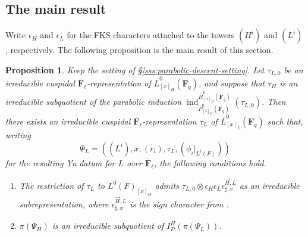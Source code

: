 \documentclass[reqno]{amsart}
\numberwithin{equation}{subsection}
\newcommand{\F}{\mathbf{F}}
\newcommand{\ol}[1]{\overline{#1}}
\DeclareMathOperator{\ind}{ind}
\newtheorem{prop}[thm]{Proposition}
\theoremstyle{remark}
\numberwithin{equation}{subsection}
\numberwithin{figure}{subsection}
\begin{document}
\subsection{The main result}

Write $\epsilon_H$ and $\epsilon_L$ for the FKS characters \cite[(3.3.1)]{CF26a} attached to the towers $(H^i)$ and $(L^i)$, respectively. The following proposition is the main result of this section. 

\begin{prop}\label{prop:tame-cuspidal-parabolic-induction}
Keep the setting of \S\ref{sss:parabolic-descent-setting}. Let $\tau_{L,0}$ be an irreducible cuspidal $\ol\F_\ell$-representation of $\ol L^0_{[x]_H}(\F_q)$, and suppose that $\tau_H$ is an irreducible subquotient of the parabolic induction $\ind_{\ol P^0_{[x]_H}(\F_q)}^{\ol H^0_{[x]_H}(\F_q)}(\tau_{L,0})$. Then there exists an irreducible cuspidal $\ol\F_\ell$-representation $\tau_L$ of $\ol L^0_{[x]_L}(\F_q)$ such that, writing 
\[
\Psi_L = ((L^i), x, (r_i), \tau_L, (\phi_i|_{L^i(F)}))
\]
for the resulting Yu datum for $L$ over $\ol\F_\ell$, the following conditions hold.
\begin{enumerate}
    \item The restriction of $\tau_L$ to $L^0(F)_{[x]_H}$ admits
    $\tau_{L,0}\otimes \epsilon_H\epsilon_L\epsilon_{\sharp,x}^{\vec H,L}$
    as an irreducible subrepresentation, where $\epsilon_{\sharp,x}^{\vec H, L}$ is the sign character from \cite[(3.3.4)]{CF26a}.
    \item $\pi(\Psi_H)$ is an irreducible subquotient of $I_P^H(\pi(\Psi_L))$.
\end{enumerate}
\end{prop}
\end{document}

